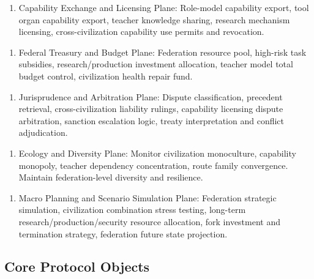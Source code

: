 \documentclass[12pt,a4paper]{article}
\begin{document}
\begin{enumerate}
  \item Capability Exchange and Licensing Plane: Role-model capability export, tool organ capability export, teacher knowledge sharing, research mechanism licensing, cross-civilization capability use permits and revocation.
\end{enumerate}

\begin{enumerate}
  \item Federal Treasury and Budget Plane: Federation resource pool, high-risk task subsidies, research/production investment allocation, teacher model total budget control, civilization health repair fund.
\end{enumerate}

\begin{enumerate}
  \item Jurisprudence and Arbitration Plane: Dispute classification, precedent retrieval, cross-civilization liability rulings, capability licensing dispute arbitration, sanction escalation logic, treaty interpretation and conflict adjudication.
\end{enumerate}

\begin{enumerate}
  \item Ecology and Diversity Plane: Monitor civilization monoculture, capability monopoly, teacher dependency concentration, route family convergence. Maintain federation-level diversity and resilience.
\end{enumerate}

\begin{enumerate}
  \item Macro Planning and Scenario Simulation Plane: Federation strategic simulation, civilization combination stress testing, long-term research/production/security resource allocation, fork investment and termination strategy, federation future state projection.
\end{enumerate}

\subsection{Core Protocol Objects}
\end{document}
